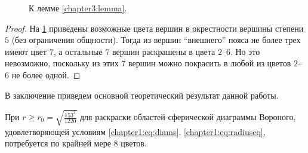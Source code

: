 \begin{figure}[h]
\centering
\captionsetup{justification=centering}
\caption{К лемме \ref{chapter3:lemma}.}
\label{chapter3:fig:lemma}
\end{figure}

\begin{proof}
На \figurename{ \ref{chapter3:fig:lemma}} приведены возможные цвета вершин в окрестности вершины степени $5$ (без ограничения общности). 
Тогда из вершин \enquote{внешнего} пояса не более трех имеют цвет $7$, а остальные $7$ вершин раскрашены в цвета $2$--$6$. Но это невозможно, поскольку из этих $7$ вершин можно покрасить в любой из цветов $2$--$6$ не более одной. 
\end{proof}




В заключение приведем основной теоретический результат данной работы.

\begin{theorem}\label{chapter3:theorem}
При $r \geq r_0 = \sqrt{\frac{153^2}{1220}}$ для раскраски областей сферической диаграммы Вороного,
удовлетворяющей условиям \ref{chapter1:eq:diams}, \ref{chapter1:eq:radiuseq}, 
потребуется по крайней мере $8$ цветов.
\end{theorem}

